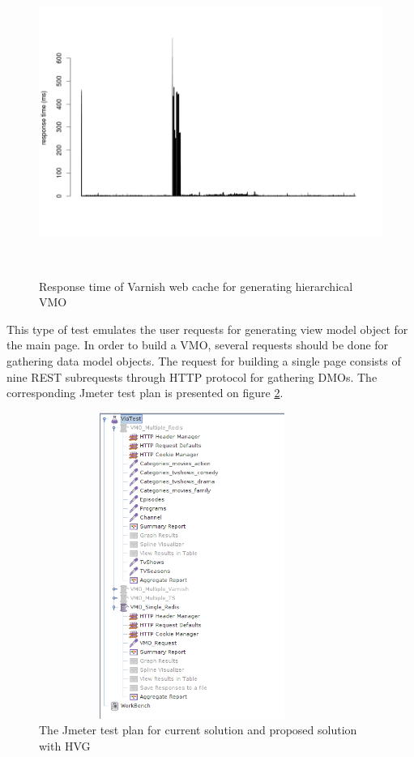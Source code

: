 \begin{figure}[h!]
    \centering
    \includegraphics[width=15cm,height=10cm,keepaspectratio]{images/vmo_varnish_mult.png}
    \caption{Response time of Varnish web cache for generating hierarchical VMO}
    \label{fig:vmo_varnish_mult}
\end{figure}


This type of test emulates the user requests for generating view model object for the main page. In order to build a VMO, several requests should be done for gathering data model objects. The request for building a single page consists of nine REST subrequests through HTTP protocol for gathering DMOs. The corresponding Jmeter test plan is presented on figure \ref{fig:vmo_testplan}.

\begin{figure}[h!]
    \centering
    \includegraphics[width=10cm,height=10cm,keepaspectratio]{images/vmo_testplan.png}
    \caption{The Jmeter test plan for current solution and proposed solution with HVG}
    \label{fig:vmo_testplan}
\end{figure}

